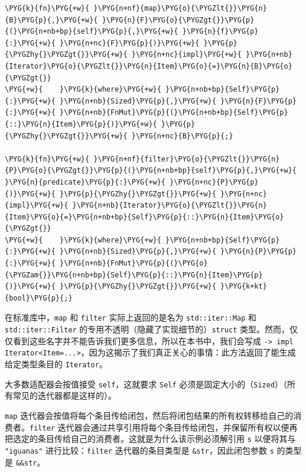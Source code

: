 \begin{Verbatim}[commandchars=\\\{\},breaklines=true,breakanywhere=true,fontsize=\codefont,xleftmargin=17bp]
\PYG{k}{fn}\PYG{+w}{ }\PYG{n+nf}{map}\PYG{o}{\PYGZlt{}}\PYG{n}{B}\PYG{p}{,}\PYG{+w}{ }\PYG{n}{F}\PYG{o}{\PYGZgt{}}\PYG{p}{(}\PYG{n+nb+bp}{self}\PYG{p}{,}\PYG{+w}{ }\PYG{n}{f}\PYG{p}{:}\PYG{+w}{ }\PYG{n+nc}{F}\PYG{p}{)}\PYG{+w}{ }\PYG{p}{\PYGZhy{}\PYGZgt{}}\PYG{+w}{ }\PYG{n+nc}{impl}\PYG{+w}{ }\PYG{n+nb}{Iterator}\PYG{o}{\PYGZlt{}}\PYG{n}{Item}\PYG{o}{=}\PYG{n}{B}\PYG{o}{\PYGZgt{}}
\PYG{+w}{    }\PYG{k}{where}\PYG{+w}{ }\PYG{n+nb+bp}{Self}\PYG{p}{:}\PYG{+w}{ }\PYG{n+nb}{Sized}\PYG{p}{,}\PYG{+w}{ }\PYG{n}{F}\PYG{p}{:}\PYG{+w}{ }\PYG{n+nb}{FnMut}\PYG{p}{(}\PYG{n+nb+bp}{Self}\PYG{p}{::}\PYG{n}{Item}\PYG{p}{)}\PYG{+w}{ }\PYG{p}{\PYGZhy{}\PYGZgt{}}\PYG{+w}{ }\PYG{n+nc}{B}\PYG{p}{;}

\PYG{k}{fn}\PYG{+w}{ }\PYG{n+nf}{filter}\PYG{o}{\PYGZlt{}}\PYG{n}{P}\PYG{o}{\PYGZgt{}}\PYG{p}{(}\PYG{n+nb+bp}{self}\PYG{p}{,}\PYG{+w}{ }\PYG{n}{predicate}\PYG{p}{:}\PYG{+w}{ }\PYG{n+nc}{P}\PYG{p}{)}\PYG{+w}{ }\PYG{p}{\PYGZhy{}\PYGZgt{}}\PYG{+w}{ }\PYG{n+nc}{impl}\PYG{+w}{ }\PYG{n+nb}{Iterator}\PYG{o}{\PYGZlt{}}\PYG{n}{Item}\PYG{o}{=}\PYG{n+nb+bp}{Self}\PYG{p}{::}\PYG{n}{Item}\PYG{o}{\PYGZgt{}}
\PYG{+w}{    }\PYG{k}{where}\PYG{+w}{ }\PYG{n+nb+bp}{Self}\PYG{p}{:}\PYG{+w}{ }\PYG{n+nb}{Sized}\PYG{p}{,}\PYG{+w}{ }\PYG{n}{P}\PYG{p}{:}\PYG{+w}{ }\PYG{n+nb}{FnMut}\PYG{p}{(}\PYG{o}{\PYGZam{}}\PYG{n+nb+bp}{Self}\PYG{p}{::}\PYG{n}{Item}\PYG{p}{)}\PYG{+w}{ }\PYG{p}{\PYGZhy{}\PYGZgt{}}\PYG{+w}{ }\PYG{k+kt}{bool}\PYG{p}{;}
\end{Verbatim}

在标准库中，\texttt{map} 和 \texttt{filter} 实际上返回的是名为 \texttt{std::iter::Map} 和 \texttt{std::iter::Filter} 的专用不透明（隐藏了实现细节的）\texttt{struct} 类型。然而，仅仅看到这些名字并不能告诉我们更多信息，所以在本书中，我们会写成 \texttt{-> impl Iterator<Item=...>}，因为这揭示了我们真正关心的事情：此方法返回了能生成给定类型条目的 \texttt{Iterator}。

大多数适配器会按值接受 \texttt{self}，这就要求 \texttt{Self} 必须是固定大小的（\texttt{Sized}）（所有常见的迭代器都是这样的）。

\texttt{map} 迭代器会按值将每个条目传给闭包，然后将闭包结果的所有权转移给自己的消费者。\texttt{filter} 迭代器会通过共享引用将每个条目传给闭包，并保留所有权以便再把选定的条目传给自己的消费者。这就是为什么该示例必须解引用 \texttt{s} 以便将其与 \texttt{"iguanas"} 进行比较：\texttt{filter} 迭代器的条目类型是 \texttt{\&str}，因此闭包参数 \texttt{s} 的类型是 \texttt{\&\&str}。

